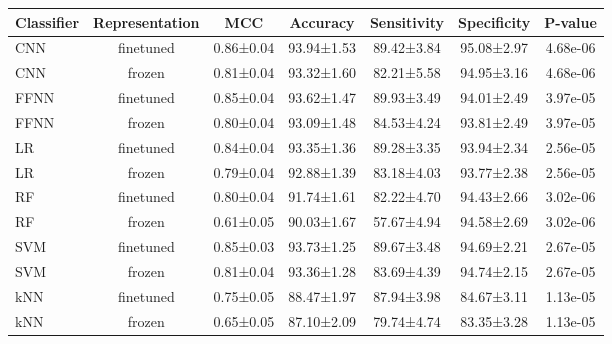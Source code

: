 \begin{tabular}{lcccccc}
\toprule
Classifier & Representation &       MCC &   Accuracy & Sensitivity & Specificity &  P-value \\
\midrule
       CNN &      finetuned & 0.86±0.04 & 93.94±1.53 &  89.42±3.84 &  95.08±2.97 & 4.68e-06 \\
       CNN &         frozen & 0.81±0.04 & 93.32±1.60 &  82.21±5.58 &  94.95±3.16 & 4.68e-06 \\
      FFNN &      finetuned & 0.85±0.04 & 93.62±1.47 &  89.93±3.49 &  94.01±2.49 & 3.97e-05 \\
      FFNN &         frozen & 0.80±0.04 & 93.09±1.48 &  84.53±4.24 &  93.81±2.49 & 3.97e-05 \\
        LR &      finetuned & 0.84±0.04 & 93.35±1.36 &  89.28±3.35 &  93.94±2.34 & 2.56e-05 \\
        LR &         frozen & 0.79±0.04 & 92.88±1.39 &  83.18±4.03 &  93.77±2.38 & 2.56e-05 \\
        RF &      finetuned & 0.80±0.04 & 91.74±1.61 &  82.22±4.70 &  94.43±2.66 & 3.02e-06 \\
        RF &         frozen & 0.61±0.05 & 90.03±1.67 &  57.67±4.94 &  94.58±2.69 & 3.02e-06 \\
       SVM &      finetuned & 0.85±0.03 & 93.73±1.25 &  89.67±3.48 &  94.69±2.21 & 2.67e-05 \\
       SVM &         frozen & 0.81±0.04 & 93.36±1.28 &  83.69±4.39 &  94.74±2.15 & 2.67e-05 \\
       kNN &      finetuned & 0.75±0.05 & 88.47±1.97 &  87.94±3.98 &  84.67±3.11 & 1.13e-05 \\
       kNN &         frozen & 0.65±0.05 & 87.10±2.09 &  79.74±4.74 &  83.35±3.28 & 1.13e-05 \\
\bottomrule
\end{tabular}

